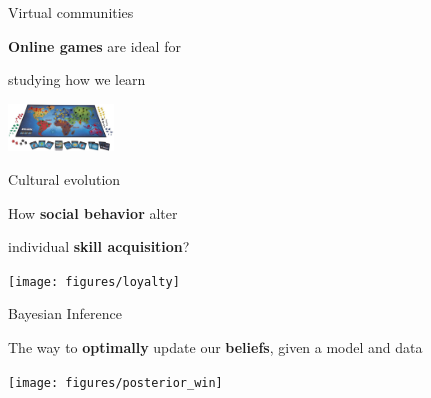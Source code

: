 \documentclass[a0]{a0poster}
\begin{document}
\begin{paracol}{3}


\begin{center}
\fontsize{85}{0}\selectfont Virtual communities
\end{center}
\vspace{1cm}


\begin{center}
\fontsize{65}{65}\selectfont \textbf{Online games} are ideal for 

studying how we learn
\end{center}

\vspace{4cm}


\begin{center}
  \includegraphics[width=0.21\textwidth]{static/risk}
 \end{center}

 \switchcolumn

\begin{center}
\fontsize{85}{0}\selectfont Cultural evolution
\end{center}

\vspace{1cm}



 
 \begin{center}
 \fontsize{65}{65}\selectfont How \textbf{social behavior} alter
  
  individual \textbf{skill acquisition}? 
 \end{center}

 \vspace{2cm}
 
 \begin{center}
  \texttt{[image: figures/loyalty]}
 \end{center}

 
 \switchcolumn

 
\begin{center}
\fontsize{85}{0}\selectfont Bayesian Inference
\end{center}

 \vspace{1cm}
 
 \begin{center}
 \fontsize{65}{65}\selectfont The way to \textbf{optimally} update
 our \textbf{beliefs}, given a model and data
 \end{center}

 \vspace{2cm}
 
\begin{center}
  \texttt{[image: figures/posterior\_win]}
 \end{center} 
 

\end{paracol}
\end{document}
